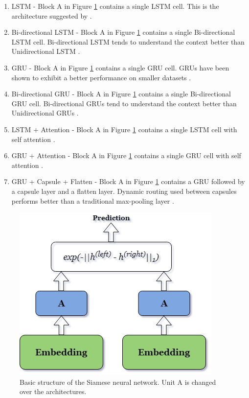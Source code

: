 \begin{enumerate}
	\item LSTM - Block A in Figure \ref{fig:siamese} contains a single LSTM cell. This is the architecture suggested by \textcite{Mueller_Thyagarajan_2016}. 
	
	\item Bi-directional LSTM - Block A in Figure \ref{fig:siamese} contains a single Bi-directional LSTM cell. Bi-directional LSTM tends to understand the context better than Unidirectional LSTM \autocite{650093}.
	
	\item GRU - Block A in Figure \ref{fig:siamese} contains a single GRU cell. GRUs have been shown to exhibit a better performance on smaller datasets \autocite{Chung2014EmpiricalEO}. 
	
	\item Bi-directional GRU - Block A in Figure \ref{fig:siamese} contains a single Bi-directional GRU cell. Bi-directional GRUs tend to understand the context better than Unidirectional GRUs \autocite{vukotic:hal-01351733}.
	
	\item LSTM + Attention - Block A in Figure \ref{fig:siamese} contains a single LSTM cell with self attention \autocite{NIPS2017_3f5ee243}.
	
	\item GRU + Attention - Block A in Figure \ref{fig:siamese} contains a single GRU cell with self attention \autocite{NIPS2017_3f5ee243}.
	
	\item GRU + Capsule + Flatten - Block A in Figure \ref{fig:siamese} contains a GRU followed by a capsule layer and a flatten layer. Dynamic routing used between capsules performs better than a traditional max-pooling layer \autocite{NIPS2017_2cad8fa4}.
	
\end{enumerate}

\begin{figure}[ht]
	\centering
	\includegraphics[scale=0.5]{figures/semantic_textual_similarity/siamese_neural_networks/siamese_architecture.png}
	\caption[Basic structure of the Siamese neural network]{Basic structure of the Siamese neural network. Unit A is changed over the architectures.}
	\label{fig:siamese}
\end{figure}


